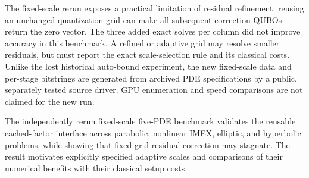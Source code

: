 The fixed-scale rerun exposes a practical limitation of residual refinement:
reusing an unchanged quantization grid can make all subsequent correction
QUBOs return the zero vector. The three added exact solves per column did
not improve accuracy in this benchmark. A refined or adaptive grid may
resolve smaller residuals, but must report the exact scale-selection rule and
its classical costs. Unlike the lost historical auto-bound experiment, the
new fixed-scale data and per-stage bitstrings are generated from archived
PDE specifications by a public, separately tested source driver. GPU
enumeration and speed comparisons are not claimed for the new run.

The independently rerun fixed-scale five-PDE benchmark validates the reusable
cached-factor interface across parabolic, nonlinear IMEX, elliptic, and
hyperbolic problems, while showing that fixed-grid residual correction may
stagnate. The result motivates explicitly specified adaptive scales and
comparisons of their numerical benefits with their classical setup costs.
